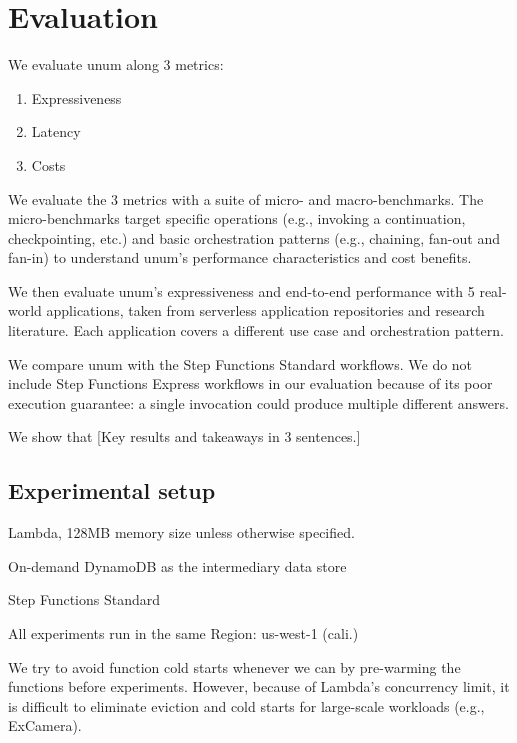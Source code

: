 
\section{Evaluation}\label{sec:eval}

We evaluate unum along 3 metrics:

\begin{enumerate}
    
    \item Expressiveness

    \item Latency

    \item Costs

\end{enumerate}

We evaluate the 3 metrics with a suite of micro- and macro-benchmarks. The
micro-benchmarks target specific operations (e.g., invoking a continuation,
checkpointing, etc.) and basic orchestration patterns (e.g., chaining, fan-out
and fan-in) to understand unum's performance characteristics and cost
benefits.

We then evaluate unum's expressiveness and end-to-end performance with 5
real-world applications, taken from serverless application repositories and
research literature. Each application covers a different use case and
orchestration pattern.

We compare unum with the Step Functions Standard workflows. We do not include
Step Functions Express workflows in our evaluation because of its poor
execution guarantee: a single invocation could produce multiple different
answers.



We show that [Key results and takeaways in 3 sentences.]

\subsection{Experimental setup}

Lambda, 128MB memory size unless otherwise specified.

On-demand DynamoDB as the intermediary data store

Step Functions Standard

All experiments run in the same Region: us-west-1 (cali.)

We try to avoid function cold starts whenever we can by pre-warming the
functions before experiments. However, because of Lambda's concurrency limit,
it is difficult to eliminate eviction and cold starts for large-scale
workloads (e.g., ExCamera).

